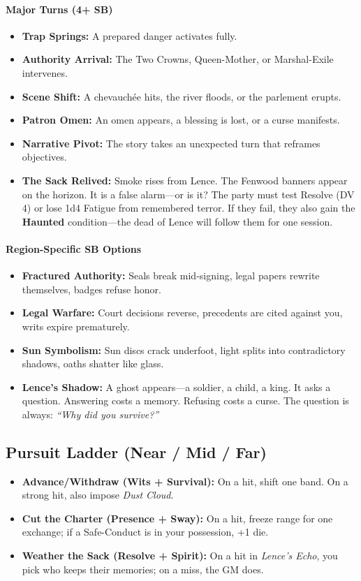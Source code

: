 \paragraph{Major Turns (4+ SB)}
\begin{itemize}
\item \textbf{Trap Springs:} A prepared danger activates fully.
\item \textbf{Authority Arrival:} The Two Crowns, Queen-Mother, or Marshal-Exile intervenes.
\item \textbf{Scene Shift:} A chevauchée hits, the river floods, or the parlement erupts.
\item \textbf{Patron Omen:} An omen appears, a blessing is lost, or a curse manifests.
\item \textbf{Narrative Pivot:} The story takes an unexpected turn that reframes objectives.
\item \textbf{The Sack Relived:} Smoke rises from Lence. The Fenwood banners appear on the horizon. It is a false alarm---or is it? The party must test Resolve (DV 4) or lose 1d4 Fatigue from remembered terror. If they fail, they also gain the \textbf{Haunted} condition---the dead of Lence will follow them for one session.
\end{itemize}

\paragraph{Region-Specific SB Options}
\begin{itemize}
\item \textbf{Fractured Authority:} Seals break mid-signing, legal papers rewrite themselves, badges refuse honor.
\item \textbf{Legal Warfare:} Court decisions reverse, precedents are cited against you, writs expire prematurely.
\item \textbf{Sun Symbolism:} Sun discs crack underfoot, light splits into contradictory shadows, oaths shatter like glass.
\item \textbf{Lence's Shadow:} A ghost appears---a soldier, a child, a king. It asks a question. Answering costs a memory. Refusing costs a curse. The question is always: \textit{``Why did you survive?''}
\end{itemize}

\subsection*{Pursuit Ladder (Near / Mid / Far)}
\begin{itemize}
\item \textbf{Advance/Withdraw (Wits + Survival):} On a hit, shift one band. On a strong hit, also impose \emph{Dust Cloud}.
\item \textbf{Cut the Charter (Presence + Sway):} On a hit, freeze range for one exchange; if a Safe-Conduct is in your possession, +1 die.
\item \textbf{Weather the Sack (Resolve + Spirit):} On a hit in \emph{Lence's Echo}, you pick who keeps their memories; on a miss, the GM does.
\end{itemize}

